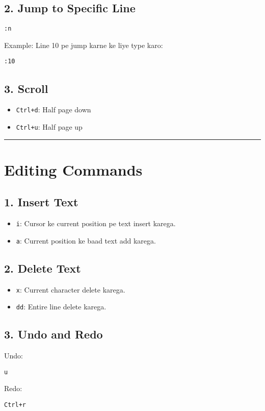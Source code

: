 \documentclass[a4paper,12pt]{article}
\begin{document}
\subsection*{2. Jump to Specific Line}
\begin{lstlisting}
:n
\end{lstlisting}
Example: Line 10 pe jump karne ke liye type karo:
\begin{lstlisting}
:10
\end{lstlisting}

\subsection*{3. Scroll}
\begin{itemize}
    \item \texttt{Ctrl+d}: Half page down
    \item \texttt{Ctrl+u}: Half page up
\end{itemize}

\hrule

\section*{Editing Commands}
\subsection*{1. Insert Text}
\begin{itemize}
    \item \texttt{i}: Cursor ke current position pe text insert karega.
    \item \texttt{a}: Current position ke baad text add karega.
\end{itemize}

\subsection*{2. Delete Text}
\begin{itemize}
    \item \texttt{x}: Current character delete karega.
    \item \texttt{dd}: Entire line delete karega.
\end{itemize}

\subsection*{3. Undo and Redo}
Undo:
\begin{lstlisting}
u
\end{lstlisting}
Redo:
\begin{lstlisting}
Ctrl+r
\end{lstlisting}
\end{document}
